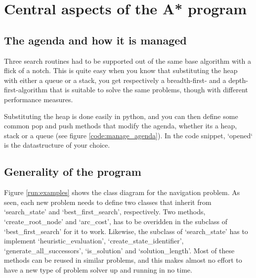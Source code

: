 \section{Central aspects of the A* program}
\subsection{The agenda and how it is managed}

Three search routines had to be supported out of the same base algorithm with a flick of a notch. This is quite easy when you know that substituting the heap with either a queue or a stack, you get respectively a breadth-first- and a depth-first-algorithm that is suitable to solve the same problems, though with different performance measures.

Substituting the heap is done easily in python, and you can then define some common pop and push methods that modify the agenda, whether its a heap, stack or a queue (see figure \ref{code:manage_agenda}). In the code snippet, `opened` is the datastructure of your choice.



\subsection{Generality of the program}



Figure \ref{run:examples} shows the class diagram for the navigation problem. As seen, each new problem needs to define two classes that inherit from `search\_state' and `best\_first\_search', respectively. Two methods, `create\_root\_node' and `arc\_cost', has to be overidden in the subclass of `best\_first\_search' for it to work. Likewise, the subclass of `search\_state' has to implement `heuristic\_evaluation', `create\_state\_identifier', `generate\_all\_successors', `is\_solution' and `solution\_length'. Most of these methods can be reused in similar problems, and this makes almost no effort to have a new type of problem solver up and running in no time.

